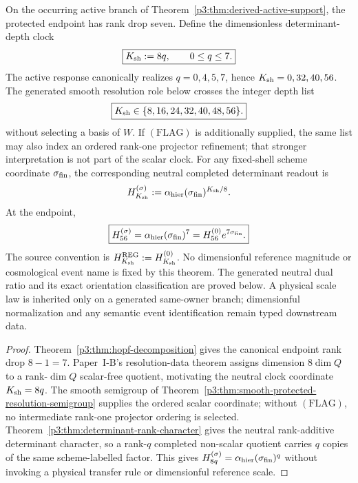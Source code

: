 \documentclass[12pt,a4paper]{article}
\begin{document}
\begin{theorem}
\label{p3:thm:basis-free-sevenfold-shell-clock}
On the occurring active branch of
Theorem~\ref{p3:thm:derived-active-support}, the protected endpoint has rank
drop seven.  Define the dimensionless determinant-depth clock
\begin{equation}
\label{p3:eq:Ksh-rank-depth}
        \boxed{K_{\mathrm{sh}}:=8q,\qquad 0\le q\le7.}
\end{equation}
The active response canonically realizes \(q=0,4,5,7\), hence
\(K_{\mathrm{sh}}=0,32,40,56\).  The generated smooth resolution role below crosses the
integer depth list
\begin{equation}
\label{p3:eq:sevenfold-shell-ladder}
        \boxed{K_{\mathrm{sh}}\in\{8,16,24,32,40,48,56\}.}
\end{equation}
without selecting a basis of \(W\).  If \((\mathrm{FLAG})\) is additionally
supplied, the same list may also index an ordered rank-one projector
refinement; that stronger interpretation is not part of the scalar clock.
For any fixed-shell scheme coordinate \(\sigma_{\rm fin}\), the corresponding
neutral completed determinant readout is
\begin{equation}
\label{p3:eq:protected-action-density-shell-clock}
        H_{K_{\mathrm{sh}}}^{(\sigma)}
        :=\alpha_{\rm hier}(\sigma_{\rm fin})^{K_{\mathrm{sh}}/8}.
\end{equation}
At the endpoint,
\begin{equation}
\label{p3:eq:terminal-shell-action-relation}
        \boxed{H_{56}^{(\sigma)}
        =\alpha_{\rm hier}(\sigma_{\rm fin})^{7}
        =H_{56}^{(0)}e^{7\sigma_{\rm fin}}.}
\end{equation}
The source convention is \(H_{K_{\mathrm{sh}}}^{\rm REG}:=H_{K_{\mathrm{sh}}}^{(0)}\).  No
dimensionful reference magnitude or cosmological event name is fixed by this
theorem.  The generated neutral dual ratio and its exact orientation
classification are proved below.  A physical scale law is inherited only on
a generated same-owner branch; dimensionful normalization and any semantic
event identification remain typed downstream data.
\end{theorem}

\begin{proof}
Theorem~\ref{p3:thm:hopf-decomposition} gives the canonical endpoint rank
drop \(8-1=7\).  Paper~I-B's resolution-data theorem assigns dimension
\(8\dim Q\) to a rank-\(\dim Q\) scalar-free quotient, motivating the neutral
clock coordinate \(K_{\mathrm{sh}}=8q\).  The smooth semigroup of
Theorem~\ref{p3:thm:smooth-protected-resolution-semigroup} supplies the
ordered scalar coordinate; without \((\mathrm{FLAG})\), no intermediate
rank-one projector ordering is selected.
Theorem~\ref{p3:thm:determinant-rank-character} gives the neutral
rank-additive determinant character, so a rank-\(q\) completed non-scalar
quotient carries \(q\) copies of the same scheme-labelled factor.  This gives
\(H_{8q}^{(\sigma)}=\alpha_{\rm hier}(\sigma_{\rm fin})^q\) without invoking
a physical transfer rule or dimensionful reference scale.
\end{proof}
\end{document}
